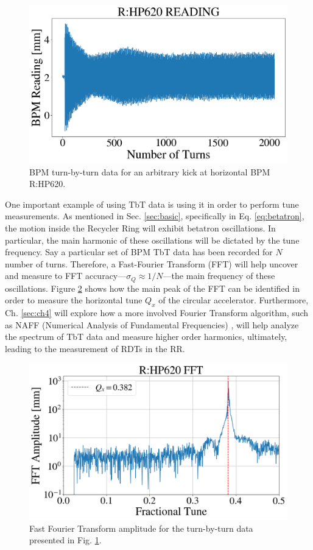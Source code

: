 \begin{figure}[H]
   \centering
   \includegraphics[width=\columnwidth]{chapter3/bpm_kick.png}
   \caption{BPM turn-by-turn data for an arbitrary kick at horizontal BPM R:HP620.}
   \label{fig:bpmkick}
\end{figure}

One important example of using TbT data is using it in order to perform tune measurements. As mentioned in Sec. \ref{sec:basic}, specifically in Eq. \ref{eq:betatron}, the motion inside the Recycler Ring will exhibit betatron oscillations. In particular, the main harmonic of these oscillations will be dictated by the tune frequency. Say a particular set of BPM TbT data has been recorded for $N$ number of turns. Therefore, a Fast-Fourier Transform (FFT) will help uncover and measure to FFT accuracy---$\sigma_Q\approx 1/N $---the main frequency of these oscillations. Figure \ref{fig:bpmfft} shows how the main peak of the FFT can be identified in order to measure the horizontal tune $Q_x$ of the circular accelerator. Furthermore, Ch. \ref{sec:ch4} will explore how a more involved Fourier Transform algorithm, such as NAFF (Numerical Analysis of Fundamental Frequencies) \cite{naff}, will help analyze the spectrum of TbT data and measure higher order harmonics, ultimately, leading to the measurement of RDTs in the RR.     

\begin{figure}[H]
   \centering
   \includegraphics[width=\columnwidth]{chapter3/bpm_fft.png}
   \caption{Fast Fourier Transform amplitude for the turn-by-turn data presented in Fig. \ref{fig:bpmkick}.}
   \label{fig:bpmfft}
\end{figure}

